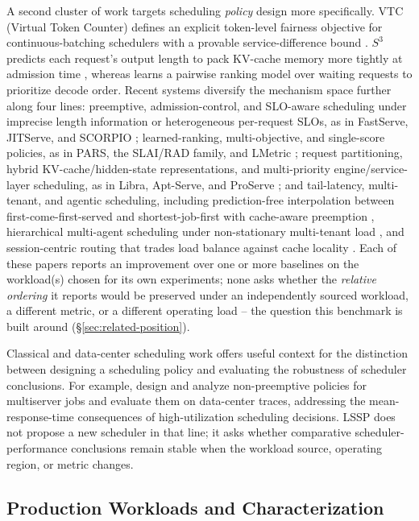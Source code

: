 A second cluster of work targets scheduling \emph{policy} design more
specifically. VTC (Virtual Token Counter) defines an explicit token-level
fairness objective for continuous-batching schedulers with a provable
service-difference bound \citep{sheng2024vtc}. $S^3$
predicts each request's output length to pack KV-cache memory more tightly
at admission time \citep{jin2023s3}, whereas
\citet{efficientllmscheduling2024} learns a pairwise ranking model over
waiting requests to prioritize decode order. Recent systems diversify the
mechanism space further along four lines: preemptive, admission-control,
and SLO-aware scheduling under imprecise length information or
heterogeneous per-request SLOs, as in FastServe, JITServe, and SCORPIO
\citep{fastserve2024,jitserve2025,scorpio2025}; learned-ranking,
multi-objective, and single-score policies, as in PARS, the SLAI/RAD family,
and LMetric \citep{pars2025,slai2025,lmetric2026}; request partitioning,
hybrid KV-cache/hidden-state representations, and multi-priority
engine/service-layer scheduling, as in Libra, Apt-Serve, and ProServe
\citep{libra2026,aptserve2025,proserve2025}; and tail-latency,
multi-tenant, and agentic scheduling, including prediction-free
interpolation between first-come-first-served and shortest-job-first with
cache-aware preemption \citep{li2026beyond},
hierarchical multi-agent scheduling under non-stationary multi-tenant load
\citep{liu2026hmas}, and session-centric routing that trades load balance
against cache locality \citep{wang2026smetric}. Each of these
papers reports an improvement over one or more baselines on
the workload(s) chosen for its own experiments; none asks whether the
\emph{relative ordering} it reports would
be preserved under an independently sourced workload, a different metric,
or a different operating load -- the question this benchmark is built
around (\S\ref{sec:related-position}).

Classical and data-center scheduling work offers useful context for the
distinction between designing a scheduling policy and evaluating the
robustness of scheduler conclusions. For example,
\citet{chen2026quickswap} design and analyze non-preemptive policies for
multiserver jobs and evaluate them on data-center traces, addressing the
mean-response-time consequences of high-utilization scheduling decisions.
LSSP does not propose a new scheduler in that line; it asks whether
comparative scheduler-performance conclusions remain stable when the
workload source, operating region, or metric changes.

\subsection{Production Workloads and Characterization}
\label{sec:related-workloads}

